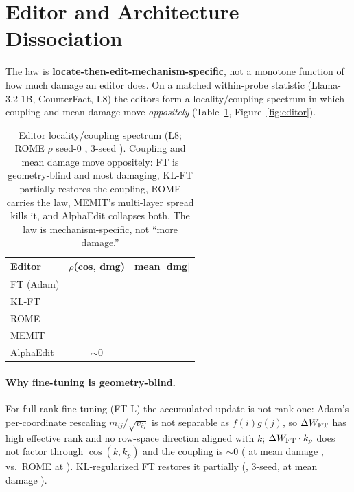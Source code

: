 \section{Editor and Architecture Dissociation}
\label{sec:dissociation}

The law is \textbf{locate-then-edit-mechanism-specific}, not a monotone
function of how much damage an editor does. On a matched within-probe statistic
(Llama-3.2-1B, CounterFact, L8) the editors form a locality/coupling spectrum
in which coupling and mean damage move \emph{oppositely}
(Table~\ref{tab:editorspectrum}, Figure~\ref{fig:editor}).



\begin{table}[t]
\centering\small
\begin{tabular}{@{}lcc@{}}
\toprule
Editor & $\rho$(cos, dmg) & mean $|$dmg$|$ \\
\midrule
FT (Adam)  & \ftRho{}      & \ftDmg{}  \\
KL-FT      & \ftkatRho{}   & \ftkatDmg{} \\
ROME       & \romeRhoSzero{} & \romeDmg{} \\
MEMIT      & \memitRhoLeight{} & \memitDmg{} \\
AlphaEdit  & $\sim$0       & \alphaFloor{} \\
\bottomrule
\end{tabular}
\caption{Editor locality/coupling spectrum (L8; ROME $\rho$ seed-0
\romeRhoSzero{}, 3-seed \romeRhoThreeSeed{}). Coupling and mean damage move
oppositely: FT is geometry-blind and most damaging, KL-FT partially restores the
coupling, ROME carries the law, MEMIT's multi-layer spread kills it, and
AlphaEdit collapses both. The law is mechanism-specific, not ``more damage.''}
\label{tab:editorspectrum}
\end{table}

\paragraph{Why fine-tuning is geometry-blind.} For full-rank fine-tuning
(FT-L) the accumulated update is not rank-one: Adam's per-coordinate rescaling
$m_{ij}/\sqrt{v_{ij}}$ is not separable as $f(i)g(j)$, so $\Delta W_{\text{FT}}$ has
high effective rank and no row-space direction aligned with $k$;
$\Delta W_{\text{FT}}\cdot k_p$ does not factor through $\cos(k,k_p)$ and the
coupling is $\sim$0 (\ftRho{} at mean damage \ftDmg{}, vs.\ ROME
\romeRhoSzero{} at \romeDmg{}). KL-regularized FT restores it partially
(\ftkatRho{}, 3-seed, at mean damage \ftkatDmg{}).

